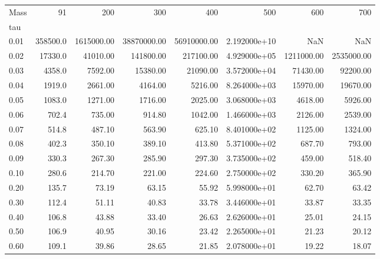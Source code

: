 \begin{tabular}{lrrrrrrr}
\toprule
Mass &       91  &         200 &          300 &          400 &           500 &         600 &         700 \\
tau   &           &             &              &              &               &             &             \\
\midrule
0.01  &  358500.0 &  1615000.00 &  38870000.00 &  56910000.00 &  2.192000e+10 &         NaN &         NaN \\
0.02  &   17330.0 &    41010.00 &    141800.00 &    217100.00 &  4.929000e+05 &  1211000.00 &  2535000.00 \\
0.03  &    4358.0 &     7592.00 &     15380.00 &     21090.00 &  3.572000e+04 &    71430.00 &    92200.00 \\
0.04  &    1919.0 &     2661.00 &      4164.00 &      5216.00 &  8.264000e+03 &    15970.00 &    19670.00 \\
0.05  &    1083.0 &     1271.00 &      1716.00 &      2025.00 &  3.068000e+03 &     4618.00 &     5926.00 \\
0.06  &     702.4 &      735.00 &       914.80 &      1042.00 &  1.466000e+03 &     2126.00 &     2539.00 \\
0.07  &     514.8 &      487.10 &       563.90 &       625.10 &  8.401000e+02 &     1125.00 &     1324.00 \\
0.08  &     402.3 &      350.10 &       389.10 &       413.80 &  5.371000e+02 &      687.70 &      793.00 \\
0.09  &     330.3 &      267.30 &       285.90 &       297.30 &  3.735000e+02 &      459.00 &      518.40 \\
0.10  &     280.6 &      214.70 &       221.00 &       224.60 &  2.750000e+02 &      330.20 &      365.90 \\
0.20  &     135.7 &       73.19 &        63.15 &        55.92 &  5.998000e+01 &       62.70 &       63.42 \\
0.30  &     112.4 &       51.11 &        40.83 &        33.78 &  3.446000e+01 &       33.87 &       33.35 \\
0.40  &     106.8 &       43.88 &        33.40 &        26.63 &  2.626000e+01 &       25.01 &       24.15 \\
0.50  &     106.9 &       40.95 &        30.16 &        23.42 &  2.265000e+01 &       21.23 &       20.12 \\
0.60  &     109.1 &       39.86 &        28.65 &        21.85 &  2.078000e+01 &       19.22 &       18.07 \\

\end{tabular}
